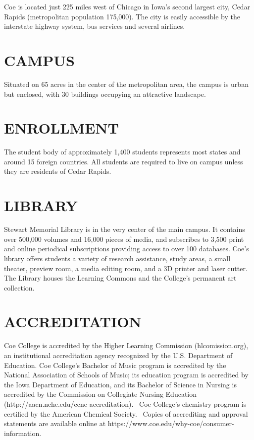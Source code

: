 \documentclass[
  letterpaper,
]{scrbook}
\begin{document}
Coe is located just 225 miles west of Chicago in Iowa's second largest
city, Cedar Rapids (metropolitan population 175,000). The city is easily
accessible by the interstate highway system, bus services and several
airlines.

\section{CAMPUS}\label{campus}

Situated on 65 acres in the center of the metropolitan area, the campus
is urban but enclosed, with 30 buildings occupying an attractive
landscape.

\section{ENROLLMENT}\label{enrollment}

The student body of approximately 1,400 students represents most states
and around 15 foreign countries. All students are required to live on
campus unless they are residents of Cedar Rapids.

\section{LIBRARY}\label{library}

Stewart Memorial Library is in the very center of the main campus. It
contains over 500,000 volumes and 16,000 pieces of media, and subscribes
to 3,500 print and online periodical subscriptions providing access to
over 100 databases. Coe's library offers students a variety of research
assistance, study areas, a small theater, preview room, a media editing
room, and a 3D printer and laser cutter. The Library houses the Learning
Commons and the College's permanent art collection.

\section{ACCREDITATION}\label{accreditation}

Coe College is accredited by the Higher Learning Commission
(hlcomission.org), an institutional accreditation agency recognized by
the U.S. Department of Education. Coe College's Bachelor of Music
program is accredited by the National Association of Schools of Music;
its education program is accredited by the Iowa Department of Education,
and its Bachelor of Science in Nursing is accredited by the Commission
on Collegiate Nursing Education
(http://aacn.nche.edu/ccne-accreditation).~ Coe College's chemistry
program is certified by the American Chemical Society.~ Copies of
accrediting and approval statements are available online at
https://www.coe.edu/why-coe/consumer-information.
\end{document}
